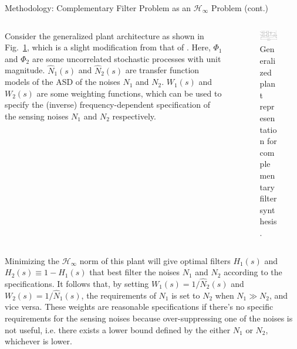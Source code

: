\documentclass{beamer}
\begin{document}
\begin{frame}[t]
\begin{columns}[t]
\begin{column}{0.32\linewidth}
\begin{block}{Methodology: Complementary Filter Problem as an $\mathcal{H}_\infty$ Problem (cont.)}
			\medskip
			
			\begin{columns}[t, onlytextwidth]
				\begin{column}{0.45\textwidth}
					Consider the generalized plant architecture as shown in Fig.~\ref{fig:generlized_plant_complementary_filter}, which is a slight modification from that of \cite{Thomas:2019}.
					Here, $\Phi_1$ and $\Phi_2$ are some uncorrelated stochastic processes with unit magnitude.
					$\hat{N}_1(s)$ and $\hat{N}_2(s)$ are transfer function models of the ASD of the noises $N_1$ and $N_2$.
					$W_1(s)$ and $W_2(s)$ are some weighting functions, which can be used to specify the (inverse) frequency-dependent specification of the sensing noises $N_1$ and $N_2$ respectively.
				\end{column}
				\begin{column}{0.5\textwidth}
					\begin{figure}[!h]
						\centering
						\includegraphics[width=1\linewidth]{generalized_plant_complementary_filter}
						\caption{Generalized plant representation for complementary filter synthesis.}
						\label{fig:generlized_plant_complementary_filter}
					\end{figure}
				\end{column}
			\end{columns}
		
			\medskip
			
			Minimizing the $\mathcal{H}_\infty$ norm of this plant will give optimal filters $H_1(s)$ and $H_2(s)\equiv 1-H_1(s)$ that best filter the noises $N_1$ and $N_2$ according to the specifications.
			It follows that, by setting $W_1(s)=1/\hat{N}_2(s)$ and $W_2(s)=1/\hat{N}_1(s)$, the requirements of $N_1$ is set to $N_2$ when $N_1\gg N_2$, and vice versa.
			These weights are reasonable specifications if there's no specific requirements for the sensing noises because over-suppressing one of the noises is not useful, i.e. there exists a lower bound defined by the either $N_1$ or $N_2$, whichever is lower.
			

\end{block}
\end{column}
\end{columns}
\end{frame}
\end{document}
